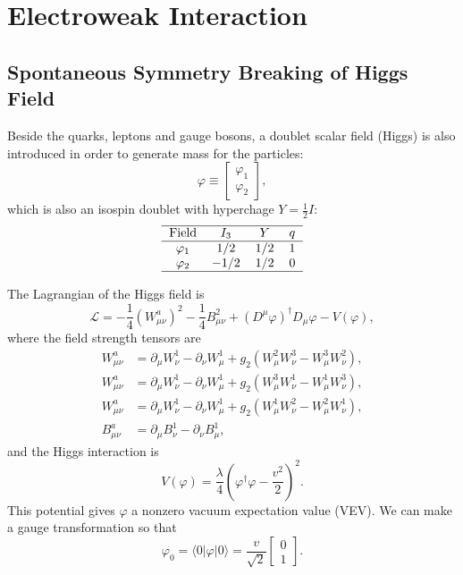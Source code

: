 \documentclass[aps,prb,superscriptaddress,nofootinbib]{revtex4}
\begin{document}
\section{Electroweak Interaction}

\subsection{Spontaneous Symmetry Breaking of Higgs Field}
Beside the quarks, leptons and gauge bosons, a doublet scalar field (Higgs) is also introduced in order to generate mass for the particles:
\begin{equation}
	\varphi \equiv \left[\begin{array}{c}
		\varphi_1 \\ \varphi_2
	\end{array} \right],
\end{equation}
which is also an isospin doublet with hyperchage $Y=\frac{1}{2}I$:
\begin{equation}
	\begin{tabular}{c c c c}
		\hline 
		Field & $I_3$ & $Y$ & $q$\\ \hline
		$\varphi_1$ & $1/2$ & $1/2$ & $1$ \\ 
		$\varphi_2$ & $-1/2$ & $1/2$ & $0$ \\  
		\hline 
	\end{tabular}
\end{equation}

The Lagrangian of the Higgs field is 
\begin{equation}\label{eq:SM-Higgs-L1}
	\mathcal L = -\frac{1}{4}(W^a_{\mu\nu})^2 - \frac{1}{4}B_{\mu\nu}^2 +(D^\mu \varphi)^\dagger D_\mu \varphi- V(\varphi),
\end{equation}
where the field strength tensors are
\begin{equation}
\begin{aligned}
	W^a_{\mu\nu} &= \partial_\mu W_\nu^1 - \partial_\nu W^1_\mu + g_2 (W_\mu^2 W_\nu^3 - W_\mu^3 W_\nu^2), \\
	W^a_{\mu\nu} &= \partial_\mu W_\nu^1 - \partial_\nu W^1_\mu + g_2 (W_\mu^3 W_\nu^1 - W_\mu^1 W_\nu^3), \\
	W^a_{\mu\nu} &= \partial_\mu W_\nu^1 - \partial_\nu W^1_\mu + g_2 (W_\mu^1 W_\nu^2 - W_\mu^2 W_\nu^1), \\
	B^a_{\mu\nu} &= \partial_\mu B_\nu^1 - \partial_\nu B^1_\mu,
\end{aligned}
\end{equation}
and the Higgs interaction is
\begin{equation}
	V(\varphi) = \frac{\lambda}{4} \left(\varphi^\dagger \varphi - \frac{v^2}{2} \right)^2.
\end{equation}
This potential gives $\varphi$ a nonzero vacuum expectation value (VEV). 
We can make a gauge transformation so that
\begin{equation}
	\varphi_0 = \langle 0| \varphi |0\rangle = \frac{v}{\sqrt 2} \left[\begin{array}{c}
		0 \\ 1	\end{array} \right].
\end{equation}
\end{document}
